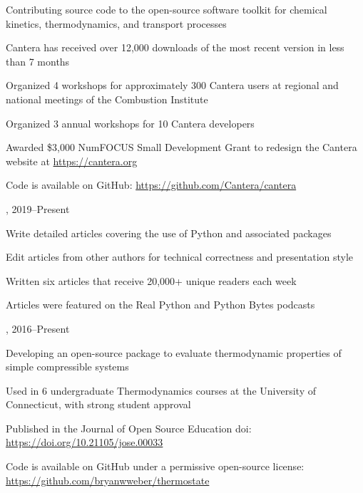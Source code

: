 \begin{innerlist}
    \item Contributing source code to the open-source software toolkit for chemical kinetics, thermodynamics, and transport processes
    \item Cantera has received over 12,000 downloads of the most recent version in less than 7 months
    \item Organized 4 workshops for approximately 300 Cantera users at regional and national meetings of the Combustion Institute
    \item Organized 3 annual workshops for 10 Cantera developers
    \item Awarded \$3,000 NumFOCUS Small Development Grant to redesign the Cantera website at \url{https://cantera.org}
    \item Code is available on GitHub: \url{https://github.com/Cantera/cantera}
\end{innerlist}

\vspace{\baselineskip}

,  \hfill 2019--Present

\begin{innerlist}
    \item Write detailed articles covering the use of Python and associated packages
    \item Edit articles from other authors for technical correctness and presentation style
    \item Written six articles that receive 20,000+ unique readers each week
    \item Articles were featured on the Real Python and Python Bytes podcasts
\end{innerlist}

\vspace{\baselineskip}

,  \hfill 2016--Present

\begin{innerlist}
    \item Developing an open-source package to evaluate thermodynamic properties of simple compressible systems
    \item Used in 6 undergraduate Thermodynamics courses at the University of Connecticut, with strong student approval
    \item Published in the Journal of Open Source Education doi: \href{https://doi.org/10.21105/jose.00033}{https://doi.org/10.21105/jose.00033}
    \item Code is available on GitHub under a permissive open-source license: \url{https://github.com/bryanwweber/thermostate}
\end{innerlist}

